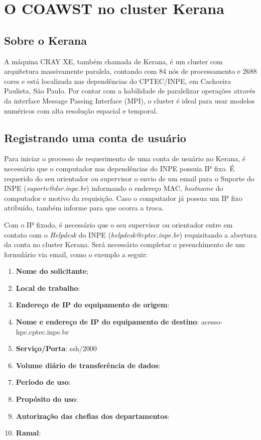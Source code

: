
\chapter{O COAWST no cluster Kerana}
\bigskip

\section{Sobre o Kerana}
\bigskip

\noindent A máquina CRAY XE, também chamada de Kerana, é um cluster com arquitetura massivamente paralela,
contando com 84 nós de processamento e 2688 cores e está localizada nas dependências do CPTEC/INPE,
em Cachoeira Paulista, São Paulo. Por contar com a habilidade de paralelizar operações através da interface
Message Passing Interface (MPI), o cluster é ideal para usar modelos numéricos com alta resolução espacial
e temporal.
\bigskip

\section{Registrando uma conta de usuário}
\bigskip

\noindent Para iniciar o processo de requerimento de uma conta de usuário no Kerana, é necessário que o computador nas dependências do INPE possuia IP fixo. É requerido do seu orientador ou supervisor o envio de um email para o Suporte do INPE (\textcolor{bleu_cite}{\textit{suporte@dsr.inpe.br}}) informando o endereço MAC, \textit{hostname} do computador e motivo da requisição. Caso o computador já possua um IP fixo atribuído, também informe para que ocorra a troca.
\bigskip

\noindent Com o IP fixado, é necessário que o seu supervisor ou orientador entre em contato com o \textit{Helpdesk} do INPE (\textcolor{bleu_cite}{\textit{helpdesk@cptec.inpe.br}}) requisitando a abertura da conta no cluster Kerana. Será necessário completar o preenchimento de um formulário via email, como o exemplo a seguir:
\bigskip
\begin{enumerate}
\item \textbf{Nome do solicitante};
\item \textbf{Local de trabalho}:
\item \textbf{Endereço de IP do equipamento de origem}:
\item \textbf{Nome e endereço de IP do equipamento de destino}: acesso-hpc.cptec.inpe.br
\item \textbf{Serviço/Porta}: ssh/2000
\item \textbf{Volume diário de transferência de dados}:
\item \textbf{Período de uso}:
\item \textbf{Propósito do uso}:
\item \textbf{Autorização das chefias dos departamentos}:
\item \textbf{Ramal}:
\end{enumerate}
\bigskip

